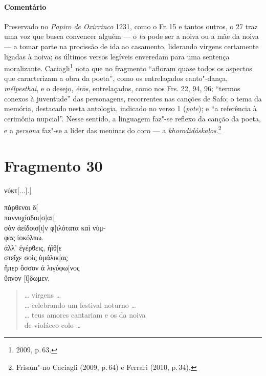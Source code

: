 {\paragraph{Comentário} {Preservado no \emph{Papiro de Oxirrinco} 1231, como o Fr.\,15 e tantos outros, o 27 traz uma voz que busca convencer alguém  --- o \emph{tu}
pode ser a noiva ou a mãe da noiva --- a tomar parte na procissão de
ida ao casamento, liderando virgens certamente ligadas à noiva; os últimos versos
legíveis enveredam para uma sentença moralizante.
Caciagli\footnote{2009, p.\,63.} nota que no fragmento ``afloram quase todos os aspectos que caracterizam a obra da poeta'', como os entrelaçados canto"-dança, \emph{mélpesthai}, e o desejo, \emph{érōs}, entrelaçados, como nos Frs. 22, 94, 96; ``termos conexos à juventude'' das personagens, recorrentes nas canções de Safo; o tema da memória, destacado nesta antologia, indicado no verso 1 (\emph{pote}); e ``a referência à cerimônia nupcial''. Nesse sentido, a linguagem faz"-se reflexo da canção da poeta, e a \emph{persona} faz"-se a líder das meninas do coro --- a \emph{khorodidáskalos}.\footnote{Frisam"-no Caciagli (2009, p.\,64) e Ferrari (2010, p.\,34).}}



\section{Fragmento 30}

\begin{gkverse}
νύκτ[...].[

πάρθενοι δ[\\
παννυχίσδοι[σ]αι[\\
σὰν ἀείδοισ[ι]ν φ[ιλότατα καὶ νύμ-\\
φας ἰοκόλπω.\\
ἀλλ’ ἐγέρθεις, ἠϊθ[ε\\
στεῖχε σοὶς ὐμάλικ[ας\\
ἤπερ ὄσσον ἀ λιγύφω[νος\\
ὔπνον [ἴ]δωμεν.
\end{gkverse}

\begin{verse}
\ldots{} virgens \ldots{}\\
\ldots{} celebrando um festival noturno \ldots{}\\
\ldots{} teus amores cantariam e os da noiva\\
de violáceo colo \ldots{}\\

\medskip


\end{verse}}
